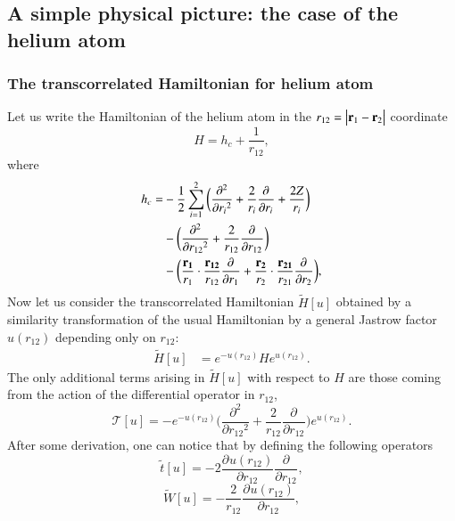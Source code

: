 \documentclass[aip,jcp,reprint,noshowkeys,superscriptaddress]{revtex4-1}
\newcommand{\deriv}[3]{\frac{\partial^{#3} #1}{\partial {#2}^{#3}}}
\newcommand{\bd}[1]{{\bf {#1}}}
\begin{document}
\subsection{A simple physical picture: the case of the helium atom}
\subsubsection{The transcorrelated Hamiltonian for helium atom}
Let us write the Hamiltonian of the helium atom in the $ r_{12} = \big|{\bf r}_1 - {\bf r}_2 \big|$ coordinate 
\begin{equation}
 H  = h_c + \frac{1}{r_{12}},
\end{equation}
where 
\begin{equation}
 \begin{aligned}
 \label{def:h_c}
 h_c = &-\frac{1}{2} \sum_{i=1}^2 \bigg(\deriv{}{r_i}{2} + \frac{2}{r_i} \deriv{}{r_i}{} + \frac{2 Z}{r_i}\bigg) \\
     &-\bigg( \deriv{}{r_{12}}{2} + \frac{2}{r_{12}} \deriv{}{r_{12}}{} \bigg) \\
     &-\bigg( \frac{\bd{r_1}}{r_1} \cdot \frac{\bd{r_{12}} }{r_{12}}  \deriv{}{r_1}{} + 
                \frac{\bd{r_2}}{r_2} \cdot \frac{\bd{r_{21}} }{r_{21}}  \deriv{}{r_2}{} \bigg),
 \end{aligned}
\end{equation}
\label{sec:he_j}
Now let us consider the transcorrelated Hamiltonian $\tilde{H}[u]$ obtained by a similarity transformation of the usual Hamiltonian by a general Jastrow factor $u(r_{12})$ depending only on $r_{12}$: 
\begin{equation}
 \label{eq:ht_0}
 \begin{aligned}
 \tilde{H}[u]&= e^{-u(r_{12})} H e^{u(r_{12})}.
 \end{aligned}
\end{equation}
The only additional terms arising in $\tilde{H}[u]$ with respect to $H$ are those coming from the action of the differential operator in $r_{12}$,
\begin{equation}
 \mathcal{T}[u] =  -e^{-u(r_{12})}\bigg( \deriv{}{r_{12}}{2} + \frac{2}{r_{12}} \deriv{}{r_{12}}{} \bigg)e^{u(r_{12})}.  
\end{equation}
After some derivation, one can notice that by defining the following operators 
\begin{equation}
 \label{eq:def_tt}
 \tilde{t}[u] = -2 \deriv{u(r_{12})}{r_{12}}{} \deriv{}{r_{12}}{},
\end{equation}
\begin{equation}
 \label{eq:def_wt}
 \tilde{W}[u] = -\frac{2}{r_{12}} \deriv{u(r_{12})}{r_{12}}{}  , 
\end{equation}
\end{document}
